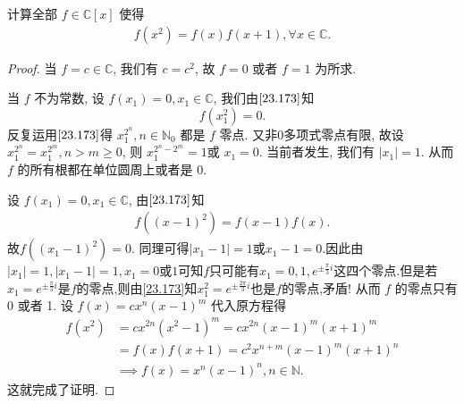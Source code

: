 \documentclass[../../main.tex]{subfiles}
\begin{document}
\begin{example}
计算全部 \( f \in \mathbb{C}[x] \) 使得
\begin{align}
f(x^2) = f(x)f(x+1), \forall x \in \mathbb{C}. \label{23.173}
\end{align}
\end{example}
\begin{proof}
当 \( f = c \in \mathbb{C} \), 我们有 \( c = c^2 \), 故 \( f = 0 \) 或者 \( f = 1 \) 为所求.

当 \( f \) 不为常数, 设 \( f(x_1) = 0, x_1 \in \mathbb{C} \), 我们由\(\eqref{23.173}\)知
\[
f(x_1^2) = 0.
\]
反复运用\(\eqref{23.173}\)得 \( x_1^{2^n}, n \in \mathbb{N}_0 \) 都是 \( f \) 零点. 又非0多项式零点有限, 故设 \( x_1^{2^n} = x_1^{2^m}, n > m \geq 0 \), 则 \( x_1^{2^n - 2^m} = 1 \)或 \( x_1 = 0 \). 当前者发生, 我们有 \( |x_1| = 1 \). 从而 \( f \) 的所有根都在单位圆周上或者是 0.

设 \( f(x_1) = 0, x_1 \in \mathbb{C} \), 由\(\eqref{23.173}\)知 
\begin{align*}
f((x-1)^2)=f(x-1)f(x).
\end{align*}
故\( f\left( (x_1 - 1)^2 \right) = 0 \). 同理可得\( |x_1 - 1| = 1 \)或$x_1-1=0$.因此由$|x_1|=1,|x_1-1|=1,x_1=0\text{或}1$可知$f$只可能有$x_1=0,1,e^{\pm \frac{\pi}{3}i} $这四个零点.但是若$x_1=e^{\pm \frac{\pi}{3}i}$是$f$的零点,则由\eqref{23.173}知$x_1^2=e^{\pm \frac{2\pi}{3}i}$也是$f$的零点,矛盾!
从而 \( f \) 的零点只有 0 或者 1. 设 \( f(x) = cx^n(x - 1)^m \) 代入原方程得
\begin{align*}
f(x^2) &= cx^{2n}(x^2 - 1)^m = cx^{2n}(x - 1)^m(x + 1)^m \\
&= f(x)f(x+1) = c^2x^{n+m}(x - 1)^m(x + 1)^n \\
&\implies f(x) = x^n(x - 1)^n, n \in \mathbb{N}.
\end{align*}
这就完成了证明.
\end{proof}
\end{document}
